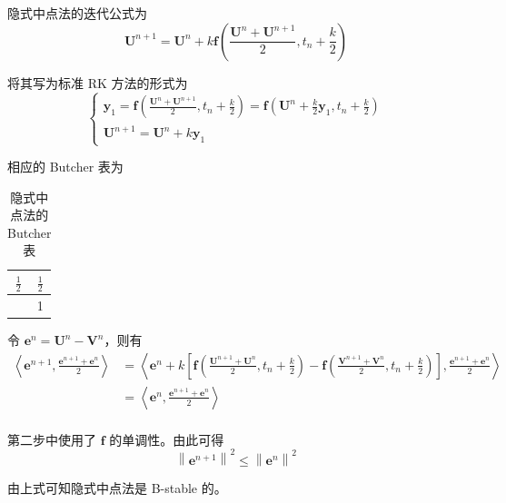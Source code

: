 \documentclass[a4paper]{article}
\begin{document}
\par 隐式中点法的迭代公式为
\begin{equation}
    \mathbf{U}^{n+1} = \mathbf{U}^n + k \mathbf{f}\left(
        \frac{\mathbf{U}^n + \mathbf{U}^{n+1}}{2}, t_n + \frac{k}{2}
    \right)
\end{equation}
\par 将其写为标准 RK 方法的形式为
\begin{equation}
    \begin{cases}
        \mathbf{y}_1 = \mathbf{f}\left(
            \frac{\mathbf{U}^n + \mathbf{U}^{n+1}}{2}, t_n + \frac{k}{2}
        \right) 
        =\mathbf{f}\left(
            \mathbf{U}^n + \frac{k}{2}\mathbf{y}_1, t_n + \frac{k}{2}
        \right)\\
        \mathbf{U}^{n+1} = \mathbf{U}^n + k\mathbf{y}_1
    \end{cases}
\end{equation}
\par 相应的 Butcher 表为
\begin{table}[htbp]
    \centering
    \caption{隐式中点法的 Butcher 表}
    \begin{tabular}{c|c}
        $\frac{1}{2}$ & $\frac{1}{2}$ \\
        \hline
         & 1
    \end{tabular}
\end{table}
\par 令 $\mathbf{e}^n = \mathbf{U}^n - \mathbf{V}^n$，则有
\begin{equation}
    \begin{aligned}
        \left\langle\mathbf{e}^{n+1}, \frac{\mathbf{e}^{n+1}+\mathbf{e}^{n}}{2}\right\rangle
        &=\left\langle\mathbf{e}^{n}+k\left[
            \mathbf{f}\left(
                \frac{\mathbf{U}^{n+1} + \mathbf{U}^n}{2}, t_n + \frac{k}{2}
            \right)
            -\mathbf{f}\left(
                \frac{\mathbf{V}^{n+1} + \mathbf{V}^n}{2}, t_n + \frac{k}{2}
            \right)
        \right], \frac{\mathbf{e}^{n+1}+\mathbf{e}^{n}}{2}\right\rangle \\
        &=\left\langle\mathbf{e}^{n}, 
        \frac{\mathbf{e}^{n+1}+\mathbf{e}^{n}}{2}\right\rangle \\
    \end{aligned}
\end{equation}
\par 第二步中使用了 $\mathbf{f}$ 的单调性。由此可得
\begin{equation}
    \left\|\mathbf{e}^{n+1}\right\|^2 \leq \left\|\mathbf{e}^{n}\right\|^2
\end{equation}
\par 由上式可知隐式中点法是 B-stable 的。


\printbibliography
\end{document}
